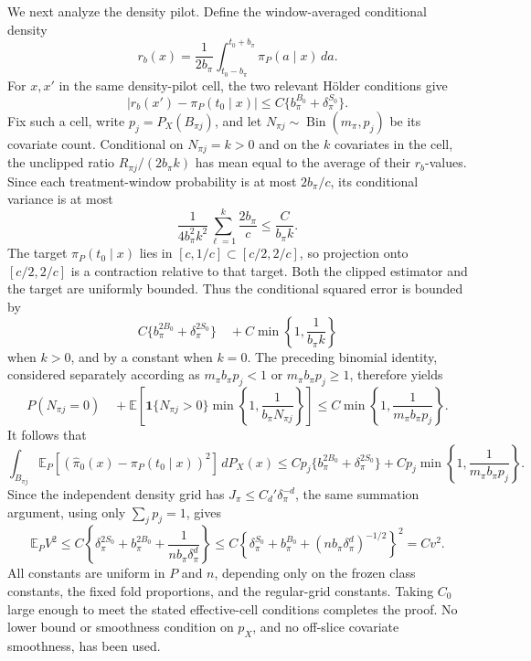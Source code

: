 We next analyze the density pilot. Define the window-averaged conditional density
\[
r_b(x)=\frac1{2b_\pi}\int_{t_0-b_\pi}^{t_0+b_\pi}\pi_P(a\mid x)\,da.
\]
For \(x,x'\) in the same density-pilot cell, the two relevant Hölder conditions give
\[
|r_b(x')-\pi_P(t_0\mid x)|
\le C\{b_\pi^{B_0}+\delta_\pi^{S_0}\}.
\]
Fix such a cell, write \(p_j=P_X(B_{\pi j})\), and let \(N_{\pi j}\sim\operatorname{Bin}(m_\pi,p_j)\) be its covariate count. Conditional on \(N_{\pi j}=k>0\) and on the \(k\) covariates in the cell, the unclipped ratio \(R_{\pi j}/(2b_\pi k)\) has mean equal to the average of their \(r_b\)-values. Since each treatment-window probability is at most \(2b_\pi/c\), its conditional variance is at most
\[
\frac1{4b_\pi^2k^2}\sum_{\ell=1}^k\frac{2b_\pi}{c}
\le\frac{C}{b_\pi k}.
\]
The target \(\pi_P(t_0\mid x)\) lies in \([c,1/c]\subset[c/2,2/c]\), so projection onto \([c/2,2/c]\) is a contraction relative to that target. Both the clipped estimator and the target are uniformly bounded. Thus the conditional squared error is bounded by
\[
C\{b_\pi^{2B_0}+\delta_\pi^{2S_0}\}
\quad +C\min\left\{1,\frac1{b_\pi k}\right\}
\]
when \(k>0\), and by a constant when \(k=0\). The preceding binomial identity, considered separately according as \(m_\pi b_\pi p_j<1\) or \(m_\pi b_\pi p_j\ge1\), therefore yields
\[
P(N_{\pi j}=0)
\quad +\mathbb E\!\left[\mathbf 1\{N_{\pi j}>0\}
\min\left\{1,\frac1{b_\pi N_{\pi j}}\right\}\right]
\le C\min\left\{1,\frac1{m_\pi b_\pi p_j}\right\}.
\]
It follows that
\[
\int_{B_{\pi j}}\mathbb E_P[(\widehat\pi_0(x)-\pi_P(t_0\mid x))^2]\,dP_X(x)
\le Cp_j\{b_\pi^{2B_0}+\delta_\pi^{2S_0}\}
 +Cp_j\min\left\{1,\frac1{m_\pi b_\pi p_j}\right\}.
\]
Since the independent density grid has \(J_\pi\le C_d'\delta_\pi^{-d}\), the same summation argument, using only \(\sum_jp_j=1\), gives
\[
\mathbb E_PV^2
\le C\left\{\delta_\pi^{2S_0}+b_\pi^{2B_0}+\frac1{nb_\pi\delta_\pi^d}\right\}
\le C\left\{\delta_\pi^{S_0}+b_\pi^{B_0}+(nb_\pi\delta_\pi^d)^{-1/2}\right\}^2
=Cv^2.
\]
All constants are uniform in \(P\) and \(n\), depending only on the frozen class constants, the fixed fold proportions, and the regular-grid constants. Taking \(C_0\) large enough to meet the stated effective-cell conditions completes the proof. No lower bound or smoothness condition on \(p_X\), and no off-slice covariate smoothness, has been used.